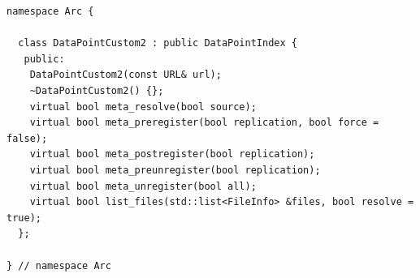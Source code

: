 \documentclass{book}
\begin{document}
\begin{verbatim}
namespace Arc {

  class DataPointCustom2 : public DataPointIndex {
   public:
    DataPointCustom2(const URL& url);
    ~DataPointCustom2() {};
    virtual bool meta_resolve(bool source);
    virtual bool meta_preregister(bool replication, bool force = false);
    virtual bool meta_postregister(bool replication);
    virtual bool meta_preunregister(bool replication);
    virtual bool meta_unregister(bool all);
    virtual bool list_files(std::list<FileInfo> &files, bool resolve = true);
  };

} // namespace Arc
\end{verbatim}

%
\end{document}
